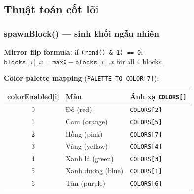 \documentclass[12pt,a4paper]{article}
\begin{document}
\subsection{Thuật toán cốt lõi}

\subsubsection{spawnBlock() --- sinh khối ngẫu nhiên}

\begin{center}
\end{center}

\noindent\textbf{Mirror flip formula:} if \texttt{(rand() \& 1) == 0}:
$\texttt{blocks}[i].x = \texttt{maxX} - \texttt{blocks}[i].x$ for all 4 blocks.

\noindent\textbf{Color palette mapping} (\texttt{PALETTE\_TO\_COLOR[7]}):

\begin{center}\small
\begin{tabular}{@{}cll@{}}
\hline
\textbf{colorEnabled[i]} & \textbf{Màu} & \textbf{Ánh xạ \texttt{COLORS[]}} \\
\hline
0 & Đỏ (red)    & \texttt{COLORS[2]} \\
1 & Cam (orange)& \texttt{COLORS[5]} \\
2 & Hồng (pink) & \texttt{COLORS[7]} \\
3 & Vàng (yellow)&\texttt{COLORS[4]} \\
4 & Xanh lá (green)&\texttt{COLORS[3]} \\
5 & Xanh dương (blue)&\texttt{COLORS[1]} \\
6 & Tím (purple)& \texttt{COLORS[6]} \\
\hline
\end{tabular}
\end{center}
\end{document}
